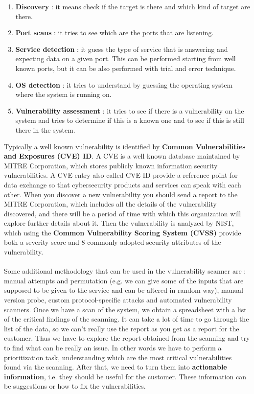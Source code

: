 \documentclass[11pt]{article}
\begin{document}
\begin{enumerate}
\item \textbf{Discovery} : it means check if the target is there and which kind of target are there.
\item \textbf{Port scans} : it tries to see which are the ports that are listening.
\item \textbf{Service detection} : it guess the type of service that is answering and expecting data on a given port. This can be performed starting from well known ports, but it can be also performed with trial and error technique.
\item \textbf{OS detection} : it tries to understand by guessing the operating system where the system is running on.
\item \textbf{Vulnerability assessment} : it tries to see if there is a vulnerability on the system and tries to determine if this is a known one and to see if this is still there in the system.
\end{enumerate}
Typically a well known vulnerability is identified by \textbf{Common Vulnerabilities and Exposures (CVE) ID}. A CVE is a well known database maintained by MITRE Corporation, which stores publicly known information security vulnerabilities. A CVE entry also called CVE ID provide a reference point for data exchange so that cybersecurity products and services can speak with each other. When you discover a new vulnerability you should send a report to the MITRE Corporation, which includes all the details of the vulnerability discovered, and there will be a period of time with which this organization will explore further details about it. Then the vulnerability is analyzed by NIST, which using the \textbf{Common Vulnerability Scoring System (CVSS)} provide both a severity score and 8 commonly adopted security attributes of the vulnerability.\\\\Some additional methodology that can be used in the vulnerability scanner are : manual attempts and permutation (e.g. we can give some of the inputs that are supposed to be given to the service and can be altered in random way), manual version probe, custom protocol-specific attacks and automated vulnerability scanners. Once we have a scan of the system, we obtain a spreadsheet with a list of the critical findings of the scanning. It can take a lot of time to go through the list of the data, so we can't really use the report as you get as a report for the customer. Thus we have to explore the report obtained from the scanning and try to find what can be really an issue. In other words we have to perform a prioritization task, understanding which are the most critical vulnerabilities found via the scanning. After that, we need to turn them into \textbf{actionable information}, i.e. they should be useful for the customer. These information can be suggestions or how to fix the vulnerabilities.
\end{document}
